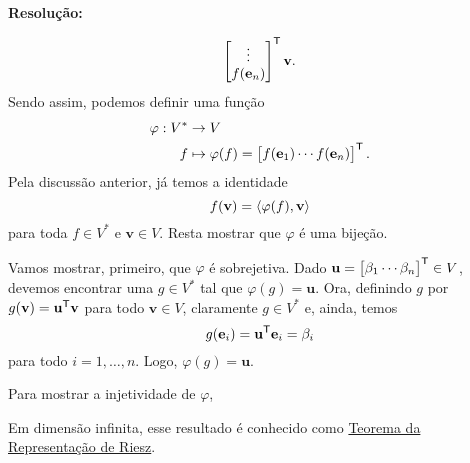 \documentclass[leqno]{article}
\numberwithin{equation}{section}
\newcommand{\bfv}{\mathbf{v}}
\newcommand{\bfu}{\mathbf{u}}
\newcommand{\bfe}{\mathbf{e}}
\newenvironment{sol}
{
    \vspace{4mm}
    \noindent\textbf{Resolução:}
    \strut\newline
    \smallskip
    \hspace{-3.5mm}
}
{}
\begin{document}
\begin{enumerate}
\begin{enumerate}
\begin{sol}
\begin{equation*}
\begin{bmatrix}
                            \vdots \\
                            f ( \bfe_{ n } )
                        \end{bmatrix}^{ \transpose }
                        \bfv
                    .\end{equation*}
                    Sendo assim, podemos definir uma função
                    \begin{align*}
                        \varphi : V^{ * } &\to V \\
                        f &\mapsto \varphi ( f ) =
                        \begin{bmatrix}
                            f ( \bfe_{ 1 } ) \cdots f ( \bfe_{ n } )
                        \end{bmatrix}^{ \transpose }
                    .\end{align*}
                    Pela discussão anterior, já temos a identidade
                    \begin{equation*}
                        f ( \bfv ) = \dotprod{\varphi ( f ), \bfv}
                    \end{equation*}
                    para toda \( f \in V^{ * } \) e \( \bfv \in V \).
                    Resta mostrar que \( \varphi \) é uma bijeção.

                    Vamos mostrar, primeiro, que \( \varphi \) é sobrejetiva.
                    Dado \( \bfu =
                    \begin{bmatrix}
                        \beta_{ 1 } \cdots \beta_{ n }
                    \end{bmatrix}^{ \transpose } \in V\), devemos encontrar uma \( g \in V^{ * } \) tal que \( \varphi ( g ) = \bfu \).
                    Ora, definindo \( g \) por \( g ( \bfv ) = \bfu^{ \transpose } \bfv \) para todo \( \bfv \in V \), claramente \( g \in V^{ * } \) e, ainda, temos
                    \begin{equation*}
                        g ( \bfe_{ i } ) = \bfu^{ \transpose } \bfe_{ i } = \beta_{ i }
                    \end{equation*}
                    para todo \( i = 1, \dots, n \).
                    Logo, \( \varphi ( g ) = \bfu \).

                    Para mostrar a injetividade de \( \varphi \), 
                \end{sol} 
        \end{enumerate}
        Em dimensão infinita, esse resultado é conhecido como \href{https://en.wikipedia.org/wiki/Riesz_representation_theorem}{Teorema da Representação de Riesz}.
\end{enumerate}
\end{document}
